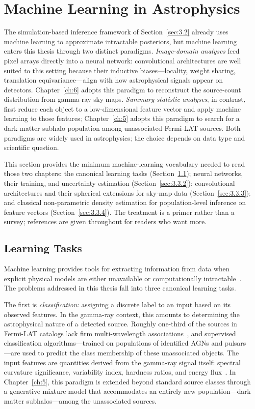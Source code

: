 \section{Machine Learning in Astrophysics}
\label{sec:3.3}

The simulation-based inference framework of Section~\ref{sec:3.2} already uses machine learning to approximate intractable posteriors, but machine learning enters this thesis through two distinct paradigms.
\emph{Image-domain analyses} feed pixel arrays directly into a neural network: convolutional architectures are well suited to this setting because their inductive biases---locality, weight sharing, translation equivariance---align with how astrophysical signals appear on detectors.
Chapter~\ref{ch:6} adopts this paradigm to reconstruct the source-count distribution from gamma-ray sky maps.
\emph{Summary-statistic analyses}, in contrast, first reduce each object to a low-dimensional feature vector and apply machine learning to those features; Chapter~\ref{ch:5} adopts this paradigm to search for a dark matter subhalo population among unassociated Fermi-LAT sources.
Both paradigms are widely used in astrophysics; the choice depends on data type and scientific question.

This section provides the minimum machine-learning vocabulary needed to read those two chapters: the canonical learning tasks (Section~\ref{sec:3.3.1}); neural networks, their training, and uncertainty estimation (Section~\ref{sec:3.3.2}); convolutional architectures and their spherical extensions for sky-map data (Section~\ref{sec:3.3.3}); and classical non-parametric density estimation for population-level inference on feature vectors (Section~\ref{sec:3.3.4}).
The treatment is a primer rather than a survey; references are given throughout for readers who want more.

\subsection{Learning Tasks}
\label{sec:3.3.1}

Machine learning provides tools for extracting information from data when explicit physical models are either unavailable or computationally intractable~\cite{bishop,Hastie:2009}.
The problems addressed in this thesis fall into three canonical learning tasks.

The first is \textit{classification}: assigning a discrete label to an input based on its observed features.
In the gamma-ray context, this amounts to determining the astrophysical nature of a detected source.
Roughly one-third of the sources in Fermi-LAT catalogs lack firm multi-wavelength associations~\cite{Bhat:2022}, and supervised classification algorithms---trained on populations of identified AGNs and pulsars---are used to predict the class membership of these unassociated objects.
The input features are quantities derived from the gamma-ray signal itself: spectral curvature significance, variability index, hardness ratios, and energy flux~\cite{Bhat:2022}.
In Chapter~\ref{ch:5}, this paradigm is extended beyond standard source classes through a generative mixture model that accommodates an entirely new population---dark matter subhalos---among the unassociated sources.

